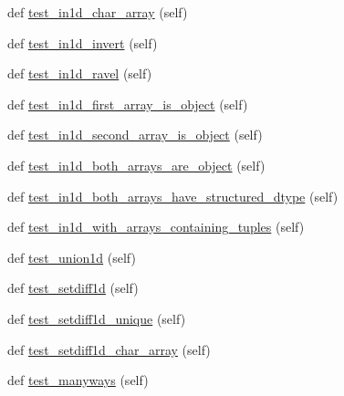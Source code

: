 \begin{DoxyCompactItemize}
\item 
def \hyperlink{classnumpy_1_1lib_1_1tests_1_1test__arraysetops_1_1TestSetOps_aa77cae0e921fd5526e1548be6501fb14}{test\+\_\+in1d\+\_\+char\+\_\+array} (self)
\item 
def \hyperlink{classnumpy_1_1lib_1_1tests_1_1test__arraysetops_1_1TestSetOps_a7d327f498c9893dc0f8719faf7cb30ac}{test\+\_\+in1d\+\_\+invert} (self)
\item 
def \hyperlink{classnumpy_1_1lib_1_1tests_1_1test__arraysetops_1_1TestSetOps_aae9115c9c49ff5386c4d2927086b0099}{test\+\_\+in1d\+\_\+ravel} (self)
\item 
def \hyperlink{classnumpy_1_1lib_1_1tests_1_1test__arraysetops_1_1TestSetOps_a60e4d84da126db800521a034d7bfa9fa}{test\+\_\+in1d\+\_\+first\+\_\+array\+\_\+is\+\_\+object} (self)
\item 
def \hyperlink{classnumpy_1_1lib_1_1tests_1_1test__arraysetops_1_1TestSetOps_afb1ce0dc4f9da2ce49d6c5ce9780336f}{test\+\_\+in1d\+\_\+second\+\_\+array\+\_\+is\+\_\+object} (self)
\item 
def \hyperlink{classnumpy_1_1lib_1_1tests_1_1test__arraysetops_1_1TestSetOps_ada1cf38506a50306e503ebf847bd25b6}{test\+\_\+in1d\+\_\+both\+\_\+arrays\+\_\+are\+\_\+object} (self)
\item 
def \hyperlink{classnumpy_1_1lib_1_1tests_1_1test__arraysetops_1_1TestSetOps_abaea1f9053e386c02a9ae0ca059099e6}{test\+\_\+in1d\+\_\+both\+\_\+arrays\+\_\+have\+\_\+structured\+\_\+dtype} (self)
\item 
def \hyperlink{classnumpy_1_1lib_1_1tests_1_1test__arraysetops_1_1TestSetOps_ae2e1cd32300409e7e5ddb90a19b8e228}{test\+\_\+in1d\+\_\+with\+\_\+arrays\+\_\+containing\+\_\+tuples} (self)
\item 
def \hyperlink{classnumpy_1_1lib_1_1tests_1_1test__arraysetops_1_1TestSetOps_af644fbbf0542b3f1d94ba3d761ad3179}{test\+\_\+union1d} (self)
\item 
def \hyperlink{classnumpy_1_1lib_1_1tests_1_1test__arraysetops_1_1TestSetOps_a7bff6efe4b503b011f566d0512368ba6}{test\+\_\+setdiff1d} (self)
\item 
def \hyperlink{classnumpy_1_1lib_1_1tests_1_1test__arraysetops_1_1TestSetOps_a527e323fd43e08deefd35c37f987fc0f}{test\+\_\+setdiff1d\+\_\+unique} (self)
\item 
def \hyperlink{classnumpy_1_1lib_1_1tests_1_1test__arraysetops_1_1TestSetOps_a57b6ca7d62b9b85bb6ff578ab3a0328d}{test\+\_\+setdiff1d\+\_\+char\+\_\+array} (self)
\item 
def \hyperlink{classnumpy_1_1lib_1_1tests_1_1test__arraysetops_1_1TestSetOps_a45a8edcb778e3bff910510563529f56a}{test\+\_\+manyways} (self)
\end{DoxyCompactItemize}
